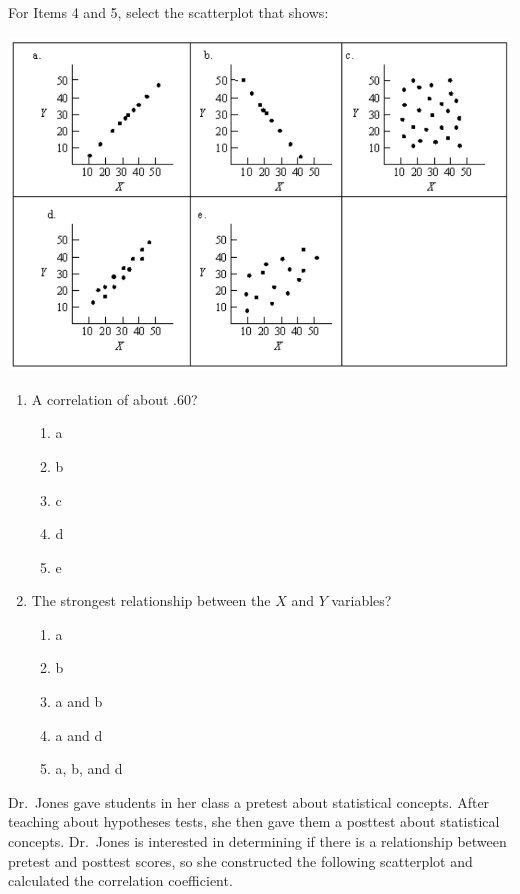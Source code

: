 \documentclass[11pt]{umnthesis}
\begin{document}
\noindent For Items 4 and 5, select the scatterplot that shows:

\begin{center}\includegraphics[width=0.8\linewidth]{figure/bra-scatterplots} \end{center}

\begin{enumerate}
\def\labelenumi{\arabic{enumi}.}
\setcounter{enumi}{3}
\tightlist
\item
  A correlation of about .60?

  \begin{enumerate}
  \def\labelenumii{\alph{enumii}.}
  \tightlist
  \item
    a
  \item
    b
  \item
    c
  \item
    d
  \item
    e
  \end{enumerate}
\item
  The strongest relationship between the \(X\) and \(Y\) variables?

  \begin{enumerate}
  \def\labelenumii{\alph{enumii}.}
  \tightlist
  \item
    a
  \item
    b
  \item
    a and b
  \item
    a and d
  \item
    a, b, and d
  \end{enumerate}
\end{enumerate}

\noindent Dr.~Jones gave students in her class a pretest about statistical concepts. After teaching about hypotheses tests, she then gave them a posttest about statistical concepts. Dr.~Jones is interested in determining if there is a relationship between pretest and posttest scores, so she constructed the following scatterplot and calculated the correlation coefficient.
\end{document}
